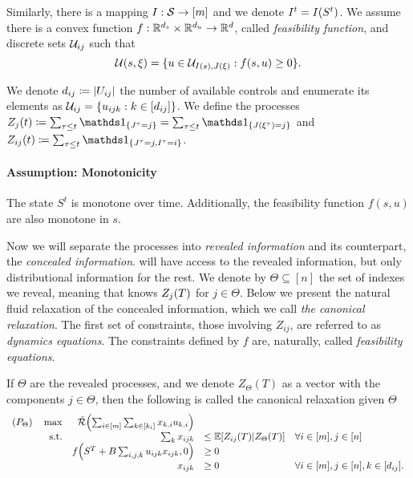 \documentclass[letterpaper,11pt]{article}
\begin{document}
Similarly, there is a mapping $I:\mathcal{S}\to [m]$ and we denote $I^t=I(S^t)$.
We assume there is a convex function $f:\mathbb{R}^{d_s}\times\mathbb{R}^{d_u}\to\mathbb{R}^d$, called \emph{feasibility function}, and discrete sets $\mathcal{U}_{ij}$ such that
\[
\mathcal{U}(s,\xi) = \{u\in \mathcal{U}_{I(s),J(\xi)}: f(s,u)\geq 0\}.
\]

We denote $d_{ij}\coloneqq \lvert U_{ij}\rvert$ the number of available controls and enumerate its elements as $\mathcal{U}_{ij} = \{u_{ijk}: k\in [d_{ij}]\}$. 
We define the processes $Z_j(t)\defeq\sum_{\tau\leq t}\In{J^\tau=j}=\sum_{\tau\leq t}\In{J(\xi^\tau)=j}$ and $Z_{ij}(t) \defeq \sum_{\tau\leq t}\In{J^\tau=j,I^\tau=i}$.


\paragraph{Assumption: Monotonicity}
The state $S^t$ is monotone over time.
Additionally, the feasibility function $f(s,u)$ are also monotone in $s$.

Now we will separate the processes into \emph{revealed information} and its counterpart, the \emph{concealed information}.
\off will have access to the revealed information, but only distributional information for the rest.
We denote by $\Theta\subseteq [n]$ the set of indexes we reveal, meaning that \off knows $Z_j(T)$ for $j\in\Theta$.
Below we present the natural fluid relaxation of the concealed information, which we call \emph{the canonical relaxation}.
The first set of constraints, those involving $Z_{ij}$, are referred to as \emph{dynamics equations}.
The constraints defined by $f$ are, naturally, called \emph{feasibility equations}.

\begin{definition}
If $\Theta$ are the revealed processes, and we denote $Z_\Theta(T)$ as a vector with the components $j\in\Theta$, then the following is called the canonical relaxation given $\Theta$
\begin{equation}\label{eq:theta_relaxation}
\begin{array}{rrll}
(P_\Theta)\quad \max  & \tilde \Re\prn*{\sum_{i\in [m]}\sum_{k\in [k_i]}x_{k,i}u_{k,i}} \\
\text{s.t.}&  \sum_k x_{ijk} & \leq \E[Z_{ij}(T)| Z_\Theta(T) ]  &\forall i\in[m], j\in[n] \\
& f\prn*{S^\T+B\sum_{i,j,k}u_{ijk}x_{ijk},0}&\geq 0  \\
& x_{ijk}&\geq 0 & \forall i\in [m], j\in [n], k\in [d_{ij}] .
\end{array}
\end{equation}
\end{definition}
\end{document}
